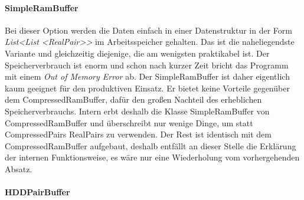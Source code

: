\documentclass[12pt,a4paper]{article}
\begin{document}
\paragraph{SimpleRamBuffer}\mbox{}
\label{sec:simplerambuffer}

Bei dieser Option werden die Daten einfach in einer Datenstruktur in der Form \textit{List<List <RealPair>>} im Arbeitsspeicher gehalten. Das ist die naheliegendste Variante und gleichzeitig diejenige, die am wenigsten praktikabel ist. Der Speicherverbrauch ist enorm und schon nach kurzer Zeit bricht das Programm mit einem \textit{Out of Memory Error} ab. Der SimpleRamBuffer ist daher eigentlich kaum geeignet für den produktiven Einsatz. Er bietet keine Vorteile gegenüber dem CompressedRamBuffer, dafür den großen Nachteil des erheblichen Speicherverbrauchs. Intern erbt deshalb die Klasse SimpleRamBuffer von CompressedRamBuffer und überschreibt nur wenige Dinge, um statt CompressedPairs RealPairs zu verwenden. Der Rest ist identisch mit dem CompressedRamBuffer aufgebaut, deshalb entfällt an dieser Stelle die Erklärung der internen Funktionsweise, es wäre nur eine Wiederholung vom vorhergehenden Absatz. \\



\paragraph{HDDPairBuffer} \mbox{}
\label{sec:hddBuffer}
\end{document}
